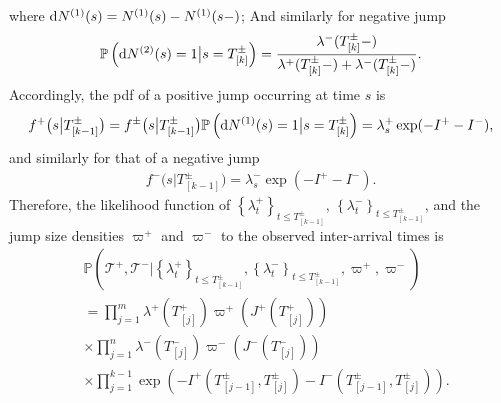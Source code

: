 \documentclass[11pt,a4paper]{article}
\numberwithin{equation}{section}
\theoremstyle{remark}
\theoremstyle{definition}
\newcommand{\dd}{{\rm d}}
\begin{document}
where $\dd N^{(1)}(s) = N^{(1)}(s) - N^{(1)}(s-)$;
And similarly for negative jump
\begin{align*}
  \mathbb{P}\left(\dd N^{(2)}(s)=1\big|s=T^\pm_{[k]}\right) = \frac{\lambda^-(T^\pm_{[k]}-)}{\lambda^+(T^\pm_{[k]}-)+\lambda^-(T^\pm_{[k]}-)}.
  \end{align*}
Accordingly, the pdf of a positive jump occurring at time $s$ is
\begin{align*}
  f^+  \big(s\big|T^\pm_{[k-1]}\big) = f^\pm\big(s\big|T^\pm_{[k-1]}\big)\mathbb{P}\left(\dd N^{(1)}(s)=1\big| s=T^\pm_{[k]}\right) = \lambda^+_s\exp(-I^+-I^-),
  \end{align*}
  and similarly for that of a negative jump
  \begin{align*}
    f^-  \big(s\big|T^\pm_{[k-1]}\big) = \lambda^-_s\exp(-I^+-I^-).
    \end{align*}
Therefore, the likelihood function of $\left\{\lambda^+_t\right\}_{t \leq T^\pm_{[k-1]}}$, $\left\{\lambda^-_t\right\}_{t \leq T^\pm_{[k-1]}}$,
and the jump size densities $\varpi^+$ and $\varpi^-$ to the observed inter-arrival times is
\begin{align*}
&\mathbb{P}\left(\mathcal{T}^+, \mathcal{T}^-\big| \left\{\lambda^+_t\right\}_{t \leq T^\pm_{[k-1]}}, \left\{\lambda^-_t\right\}_{t \leq T^\pm_{[k-1]}}, \varpi^+, \varpi^-\right)\\
&= \prod_{j=1}^m \lambda^+(T^+_{[j]})\varpi^+(J^+(T^+_{[j]})) \\
&\times \prod_{j=1}^n \lambda^-(T^-_{[j]})\varpi^-(J^-(T^-_{[j]}))\\
&\times \prod_{j=1}^{k-1}\exp\left(-I^+(T^\pm_{[j-1]}, T^\pm_{[j]}) - I^-(T^\pm_{[j-1]}, T^\pm_{[j]})\right).
\end{align*}
\end{document}
